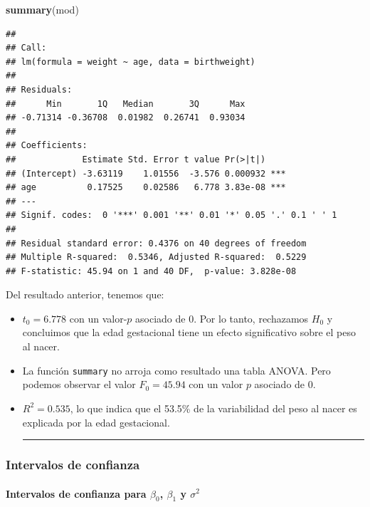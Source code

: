 \documentclass[
]{article}
\newenvironment{Shaded}{\begin{snugshade}}{\end{snugshade}}
\newcommand{\FunctionTok}[1]{\textcolor[rgb]{0.13,0.29,0.53}{\textbf{#1}}}
\newcommand{\NormalTok}[1]{#1}
\providecommand{\tightlist}{%
  \setlength{\itemsep}{0pt}\setlength{\parskip}{0pt}}
\begin{document}
\begin{Shaded}
\begin{Highlighting}[]
\FunctionTok{summary}\NormalTok{(mod)}
\end{Highlighting}
\end{Shaded}

\begin{verbatim}
## 
## Call:
## lm(formula = weight ~ age, data = birthweight)
## 
## Residuals:
##      Min       1Q   Median       3Q      Max 
## -0.71314 -0.36708  0.01982  0.26741  0.93034 
## 
## Coefficients:
##             Estimate Std. Error t value Pr(>|t|)    
## (Intercept) -3.63119    1.01556  -3.576 0.000932 ***
## age          0.17525    0.02586   6.778 3.83e-08 ***
## ---
## Signif. codes:  0 '***' 0.001 '**' 0.01 '*' 0.05 '.' 0.1 ' ' 1
## 
## Residual standard error: 0.4376 on 40 degrees of freedom
## Multiple R-squared:  0.5346, Adjusted R-squared:  0.5229 
## F-statistic: 45.94 on 1 and 40 DF,  p-value: 3.828e-08
\end{verbatim}

Del resultado anterior, tenemos que:

\begin{itemize}
\tightlist
\item
  \(t_{0}=6.778\) con un valor-\(p\) asociado de 0. Por lo tanto, rechazamos \(H_{0}\) y concluimos que la edad gestacional tiene un efecto significativo sobre el peso al nacer.
\item
  La función \texttt{summary} no arroja como resultado una tabla ANOVA. Pero podemos observar el valor \(F_{0} = 45.94\) con un valor \(p\) asociado de 0.
\item
  \(R^{2} = 0.535\), lo que indica que el 53.5\% de la variabilidad del peso al nacer es explicada por la edad gestacional.

  \rule{\textwidth}{0.4pt}
\end{itemize}

\hypertarget{intervalos-de-confianza}{%
\subsubsection{Intervalos de confianza}\label{intervalos-de-confianza}}

\hypertarget{intervalos-de-confianza-para-beta_0-beta_1-y-sigma2}{%
\paragraph*{\texorpdfstring{Intervalos de confianza para \(\beta_{0}\), \(\beta_{1}\) y \(\sigma^{2}\)}{Intervalos de confianza para \textbackslash beta\_\{0\}, \textbackslash beta\_\{1\} y \textbackslash sigma\^{}\{2\}}}\label{intervalos-de-confianza-para-beta_0-beta_1-y-sigma2}}
\end{document}

